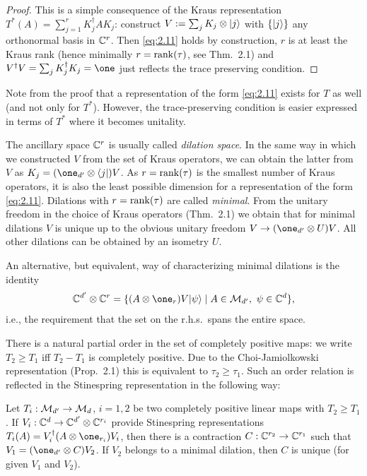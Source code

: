 \documentclass[11pt,a4paper]{article}
\numberwithin{equation}{section}
\theoremstyle{plain}
\theoremstyle{definition}
\begin{document}
\begin{proof}
    This is a simple consequence of the Kraus representation
    $T^*(A)=\sum_{j=1}^r K_j^\dagger A K_j$: construct
    $V := \sum_j K_j \otimes |j\rangle$ with $\{|j\rangle\}$ any orthonormal basis in
    $\mathbb{C}^r$. Then \eqref{eq:2.11} holds by construction, $r$ is at least the Kraus rank
    (hence minimally $r=\operatorname{rank}(\tau)$, see Thm.~2.1) and
    $V^\dagger V=\sum_j K_j^\dagger K_j=\one$ just reflects the trace preserving
    condition.
\end{proof}

Note from the proof that a representation of the form \eqref{eq:2.11} exists for $T$
as well (and not only for $T^*$). However, the trace-preserving condition is easier
expressed in terms of $T^*$ where it becomes unitality.

The ancillary space $\mathbb{C}^r$ is usually called \emph{dilation space}. In the same way
in which we constructed $V$ from the set of Kraus operators, we can obtain the
latter from $V$ as $K_j = (\one_{d'}\otimes \bra{j})V$. As $r=\operatorname{rank}(\tau)$ is the
smallest number of Kraus operators, it is also the least possible dimension for a
representation of the form \eqref{eq:2.11}. Dilations with $r=\operatorname{rank}(\tau)$ are
called \emph{minimal}. From the unitary freedom in the choice of Kraus operators
(Thm.~2.1) we obtain that for minimal dilations $V$ is unique up to the obvious
unitary freedom $V \to (\one_{d'} \otimes U)V$. All other dilations can be obtained
by an isometry $U$.

An alternative, but equivalent, way of characterizing minimal dilations is the
identity
\begin{equation}\label{eq:2.12}
    \CC^{d'} \otimes \CC^r
    = \{ (A \otimes \one_r)V\ket{\psi} \mid A\in \mcM_{d'},\ \psi\in\CC^d \},
\end{equation}
i.e., the requirement that the set on the r.h.s.\ spans the entire space.

There is a natural partial order in the set of completely positive maps: we write
$T_2 \ge T_1$ iff $T_2-T_1$ is completely positive. Due to the Choi-Jamiolkowski
representation (Prop.~2.1) this is equivalent to $\tau_2 \ge \tau_1$. Such an order
relation is reflected in the Stinespring representation in the following way:

\begin{theorem}
    Let $T_i:\mathcal{M}_{d'} \to \mathcal{M}_d$, $i=1,2$ be two completely positive linear maps with
    $T_2 \ge T_1$. If $V_i:\mathbb{C}^d \to \mathbb{C}^{d'} \otimes \mathbb{C}^{r_i}$ provide Stinespring
    representations $T_i(A)=V_i^\dagger(A\otimes \one_{r_i})V_i$, then there is a
    contraction $C:\mathbb{C}^{r_2} \to \mathbb{C}^{r_1}$ such that $V_1=(\one_{d'}\otimes C)V_2$. If
    $V_2$ belongs to a minimal dilation, then $C$ is unique (for given $V_1$ and $V_2$).
\end{theorem}
\end{document}
